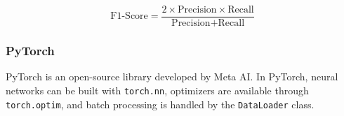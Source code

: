 \documentclass{article}
\begin{document}
\begin{multicols}{2}
$$ \text{F1-Score} = \frac{2\times\text{Precision}\times\text{Recall}}{\text{Precision}+\text{Recall}} $$ \cite{b_confusion_2020}

\subsubsection*{PyTorch}
PyTorch is an open-source library developed by Meta AI. In PyTorch, neural networks can be built with \texttt{torch.nn}, optimizers are available through \texttt{torch.optim}, and batch processing is handled by the \texttt{DataLoader} class.  \cite{brovold_less_2024} \cite{paszke2019pytorch}

\end{multicols}


\newpage
\end{document}
